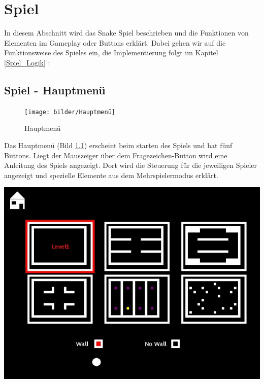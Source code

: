 \chapter{Spiel}
\label{Spiel}
%
In diesem Abschnitt wird das Snake Spiel beschrieben und die Funktionen von Elementen im Gameplay oder Buttons erkl{\"a}rt. Dabei gehen wir auf die Funktionsweise des Spieles ein, die Implementierung folgt im Kapitel \ref{Spiel_Logik} : 


\section{Spiel - Hauptmen{\"u}}
\label{Spiel_-_Hauptmenü}
%
\begin{figure}[h]
 \centering
 \texttt{[image: bilder/Hauptmenü]}
 \caption{Hauptmen{\"u}}
 \label{fig:hauptmenü}
\end{figure}
Das Hauptmen{\"u} (Bild \ref{fig:hauptmenü}) erscheint beim starten des Spiels und hat f{\"u}nf Buttons. Liegt der Mauszeiger {\"u}ber dem Fragezeichen-Button wird eine Anleitung des Spiels angezeigt. Dort wird die Steuerung f{\"u}r die jeweiligen Spieler angezeigt und spezielle Elemente aus dem Mehrspielermodus erkl{\"a}rt.\\
\begin{minipage}[X]{1.1\textwidth}
 \centering
 \includegraphics[scale=0.5]{bilder/Einstellungen}
 \label{fig:einstellungen}
\end{minipage}
